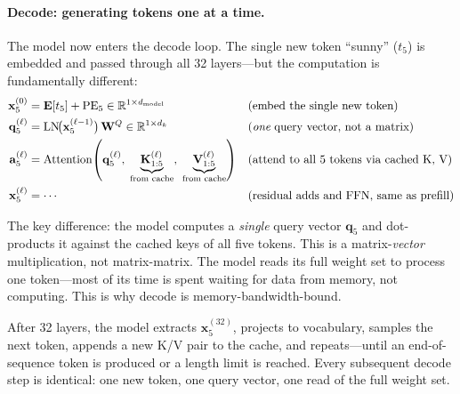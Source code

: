 \paragraph{Decode: generating tokens one at a time.} The model now enters the decode loop. The single new token ``sunny'' ($t_5$) is embedded and passed through all 32 layers---but the computation is fundamentally different:
\begin{align}
\mathbf{x}_5^{(0)} &= \mathbf{E}[t_5] + \text{PE}_5 \in \mathbb{R}^{1 \times d_{\text{model}}} & &(\text{embed the single new token}) \notag \\
\mathbf{q}_5^{(\ell)} &= \text{LN}\!\big(\mathbf{x}_5^{(\ell-1)}\big)\,\mathbf{W}^Q \in \mathbb{R}^{1 \times d_k} & &(\textit{one}\text{ query vector, not a matrix}) \notag \\
\mathbf{a}_5^{(\ell)} &= \text{Attention}\!\left(\mathbf{q}_5^{(\ell)},\; \underbrace{\mathbf{K}_{1:5}^{(\ell)}}_{\text{from cache}},\; \underbrace{\mathbf{V}_{1:5}^{(\ell)}}_{\text{from cache}}\right) & &(\text{attend to all 5 tokens via cached K, V}) \notag \\
\mathbf{x}_5^{(\ell)} &= \cdots & &(\text{residual adds and FFN, same as prefill})
\end{align}

The key difference: the model computes a \emph{single} query vector $\mathbf{q}_5$ and dot-products it against the cached keys of all five tokens. This is a matrix-\emph{vector} multiplication, not matrix-matrix. The model reads its full weight set to process one token---most of its time is spent waiting for data from memory, not computing. This is why decode is memory-bandwidth-bound.

After 32 layers, the model extracts $\mathbf{x}_5^{(32)}$, projects to vocabulary, samples the next token, appends a new K/V pair to the cache, and repeats---until an end-of-sequence token is produced or a length limit is reached. Every subsequent decode step is identical: one new token, one query vector, one read of the full weight set.

